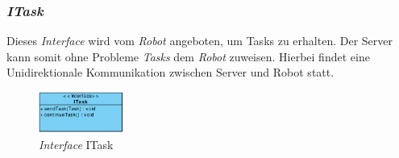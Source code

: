 	\subsubsection{\textit{ITask}}
	Dieses \textit{Interface} wird vom \textit{Robot} angeboten, um Tasks zu erhalten. Der Server kann somit ohne Probleme \textit{Tasks} dem \textit{Robot} zuweisen. Hierbei findet eine Unidirektionale Kommunikation zwischen Server und Robot statt.
	\begin{figure}[H]
	\centering
	\includegraphics[width=0.25\textwidth]{img/1-Entwurf-3-1_ITask}
	\caption{\textit{Interface} ITask}
	\label{ITask}
	\end{figure}
